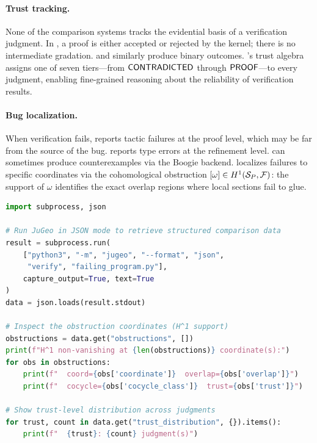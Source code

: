 \paragraph{Trust tracking.}
None of the comparison systems tracks the evidential basis of a
verification judgment.  In \LEAN{}, a proof is either accepted or
rejected by the kernel; there is no intermediate gradation.
\Fstar{} and \Dafny{} similarly produce binary outcomes.  \JuGeo{}'s
trust algebra assigns one of seven tiers---from $\mathsf{CONTRADICTED}$ through
$\mathsf{PROOF}$---to every judgment, enabling fine-grained reasoning about
the reliability of verification results.

\paragraph{Bug localization.}
When verification fails, \LEAN{} reports tactic failures at the proof
level, which may be far from the source of the bug.  \Fstar{} reports
type errors at the refinement level.  \Dafny{} can sometimes produce
counterexamples via the Boogie backend.  \JuGeo{} localizes failures
to specific coordinates via the cohomological obstruction
$[\omega] \in H^{1}(\mathcal{S}_P, \mathcal{F})$: the support of $\omega$
identifies the exact overlap regions where local sections fail to glue.

\begin{lstlisting}[language=Python, caption={Comparing \JuGeo{} semantic-site diagnostics against a baseline analysis for a failing program.}]
import subprocess, json

# Run JuGeo in JSON mode to retrieve structured comparison data
result = subprocess.run(
    ["python3", "-m", "jugeo", "--format", "json",
     "verify", "failing_program.py"],
    capture_output=True, text=True
)
data = json.loads(result.stdout)

# Inspect the obstruction coordinates (H^1 support)
obstructions = data.get("obstructions", [])
print(f"H^1 non-vanishing at {len(obstructions)} coordinate(s):")
for obs in obstructions:
    print(f"  coord={obs['coordinate']}  overlap={obs['overlap']}")
    print(f"  cocycle={obs['cocycle_class']}  trust={obs['trust']}")

# Show trust-level distribution across judgments
for trust, count in data.get("trust_distribution", {}).items():
    print(f"  {trust}: {count} judgment(s)")
\end{lstlisting}

